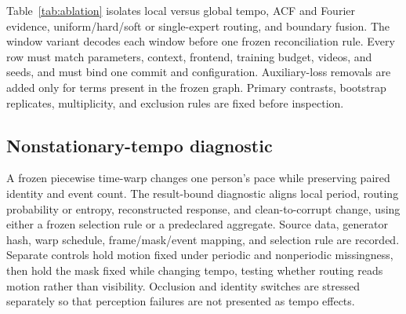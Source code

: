 Table~\ref{tab:ablation} isolates local versus global tempo, ACF and Fourier
evidence, uniform/hard/soft or single-expert routing, and boundary fusion. The
window variant decodes each window before one frozen reconciliation rule. Every
row must match parameters, context, frontend, training budget, videos, and
seeds, and must bind one commit and configuration. Auxiliary-loss removals are
added only for terms present in the frozen graph. Primary contrasts, bootstrap
replicates, multiplicity, and exclusion rules are fixed before inspection.

\subsection{Nonstationary-tempo diagnostic}
A frozen piecewise time-warp changes one person's pace while preserving paired
identity and event count. The result-bound diagnostic aligns local period,
routing probability or entropy, reconstructed response, and clean-to-corrupt
change, using either a frozen selection rule or a predeclared aggregate. Source
data, generator hash, warp schedule, frame/mask/event mapping, and selection
rule are recorded. Separate controls hold motion fixed under periodic and
nonperiodic missingness, then hold the mask fixed while changing tempo, testing
whether routing reads motion rather than visibility. Occlusion and identity
switches are stressed separately so that perception failures are not presented
as tempo effects.
